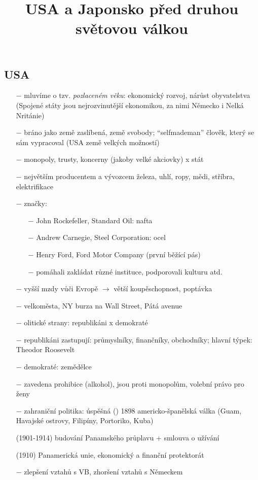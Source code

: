 \documentclass{article}
\title{\vspace{-2cm}USA a Japonsko před druhou světovou válkou\vspace{-1.7cm}}
\date{}
\author{}
\begin{document}
\maketitle

\subsection*{USA}
\begin{itemize}
    \vspace{-0.5em}
    \setlength\itemsep{0.15em}
    \item[$-$] mluvíme o tzv. \textit{pozlaceném věku}: ekonomický rozvoj, nárůst obyvatelstva (Spojené státy jsou nejrozvinutější ekonomikou, za nimi Německo i Nelká Nritánie)
    \item[$-$] bráno jako země zaslíbená, země svobody; “selfmademan” člověk, který se sám vypracoval (USA země velkých možností)
    \item[$-$] monopoly, trusty, koncerny (jakoby velké akciovky) x stát
    \item[$-$] největším producentem a vývozcem železa, uhlí, ropy, mědi, stříbra, elektrifikace
    \item[$-$] značky:  \begin{itemize}
        \vspace{-0.5em}
        \setlength\itemsep{0.15em}
        \item[$-$] John Rockefeller, Standard Oil: nafta
        \item[$-$] Andrew Carnegie, Steel Corporation: ocel
        \item[$-$] Henry Ford, Ford Motor Company (první běžící pás)
        \item[$-$] pomáhali zakládat různé instituce, podporovali kulturu atd.
    \end{itemize}
    \item[$-$] vyšší mzdy vůči Evropě $\rightarrow$ větší koupěschopnost, poptávka
    \item[$-$] velkoměsta, NY burza na Wall Street, Pátá avenue
    \item[$-$] olitické strany: republikáni x demokraté
    \item[$-$] republikáni zastupují: průmyslníky, finančníky, obchodníky; hlavní týpek: Theodor Roosevelt
    \item[$-$] demokraté: zemědělce
    \item[$-$] zavedena prohibice (alkohol), jsou proti monopolům, volební právo pro ženy
    \item[$-$] zahraniční politika: úspěšná () 1898 americko-španělská válka (Guam, Havajské ostrovy, Filipíny, Portoriko, Kuba)
    \item[(1901-1914)] budování Panamského průplavu  + smlouva o užívání
    \item[(1910)] Panamerická unie, ekonomický a finanční protektorát
    \item[$-$] zlepšení vztahů s VB, zhoršení vztahů s Německem

\end{itemize}
\end{document}
